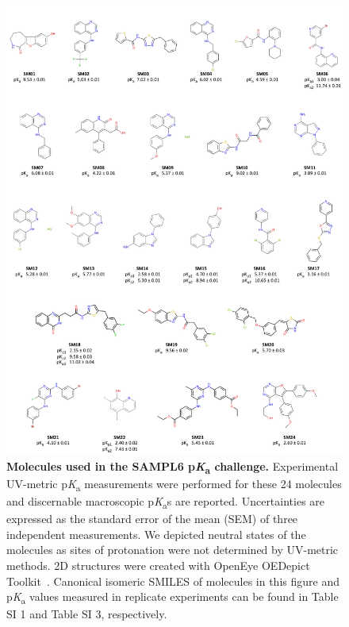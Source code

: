 \documentclass[9pt,lineno]{elife}
\newcommand{\pKa}{p\textit{K}\textsubscript{a}}
\begin{document}
\begin{figure}
\includegraphics[width=1.00\linewidth]{figures/SAMPL6_pKa_molecules_fig}
\caption{{\bf Molecules used in the SAMPL6 \pKa{} challenge.} 
Experimental UV-metric \pKa{} measurements were performed for these 24 molecules and discernable macroscopic \pKa{}s are reported. 
Uncertainties are expressed as the standard error of the mean (SEM) of three independent measurements. We depicted neutral states of the molecules as sites of protonation were not determined by UV-metric methods.
2D structures were created with OpenEye OEDepict Toolkit~\citep{oedepict_openeye_2017}. Canonical isomeric SMILES of molecules in this figure and \pKa{} values measured in replicate experiments can be found in Table SI 1 and Table SI 3, respectively.
}
\label{fig:pKa_molecules}
\end{figure}
\end{document}
